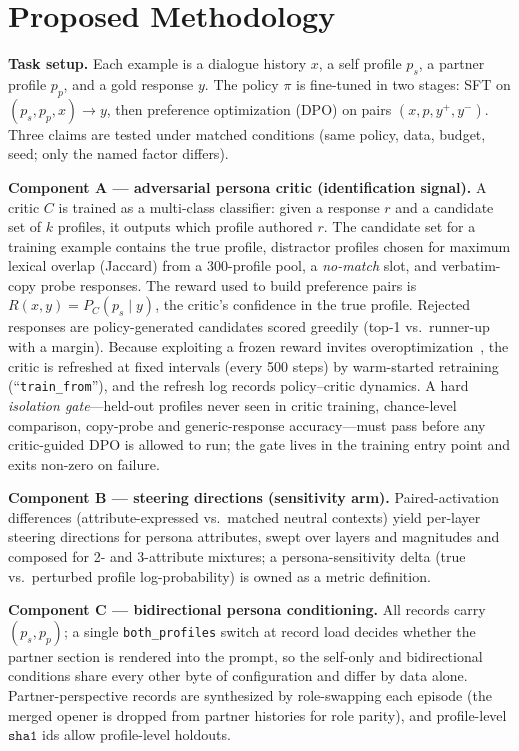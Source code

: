 \documentclass[lettersize,journal]{IEEEtran}
\begin{document}
\section{Proposed Methodology}
\label{sec:method}
\textbf{Task setup.} Each example is a dialogue history $x$, a self profile
$p_s$, a partner profile $p_p$, and a gold response $y$. The policy $\pi$ is
fine-tuned in two stages: SFT on $(p_s,p_p,x)\!\rightarrow\!y$, then preference
optimization (DPO) on pairs $(x,p,y^+,y^-)$. Three claims are tested under
matched conditions (same policy, data, budget, seed; only the named factor
differs).

\textbf{Component A --- adversarial persona critic (identification signal).}
A critic $C$ is trained as a multi-class classifier: given a response $r$ and a
candidate set of $k$ profiles, it outputs which profile authored $r$. The
candidate set for a training example contains the true profile, distractor
profiles chosen for maximum lexical overlap (Jaccard) from a 300-profile pool,
a \emph{no-match} slot, and verbatim-copy probe responses. The reward used to
build preference pairs is $R(x,y)=P_C(p_s\mid y)$, the critic's confidence in
the true profile. Rejected responses are policy-generated candidates scored
greedily (top-1 vs.\ runner-up with a margin). Because exploiting a frozen
reward invites overoptimization~\cite{gao2023overopt}, the critic is refreshed
at fixed intervals (every 500 steps) by warm-started retraining
(``\texttt{train\_from}''), and the refresh log records policy--critic dynamics.
A hard \emph{isolation gate}---held-out profiles never seen in critic training,
chance-level comparison, copy-probe and generic-response
accuracy---must pass before any critic-guided DPO is allowed to run; the gate
lives in the training entry point and exits non-zero on failure.

\textbf{Component B --- steering directions (sensitivity arm).} Paired-activation
differences (attribute-expressed vs.\ matched neutral contexts) yield per-layer
steering directions for persona attributes, swept over layers and magnitudes
and composed for 2- and 3-attribute mixtures; a persona-sensitivity delta
(true vs.\ perturbed profile log-probability) is owned as a metric definition.

\textbf{Component C --- bidirectional persona conditioning.} All records carry
$(p_s,p_p)$; a single \texttt{both\_profiles} switch at record load decides
whether the partner section is rendered into the prompt, so the self-only and
bidirectional conditions share every other byte of configuration and differ by
data alone. Partner-perspective records are synthesized by role-swapping each
episode (the merged opener is dropped from partner histories for role parity),
and profile-level $\texttt{sha1}$ ids allow profile-level holdouts.
\end{document}
